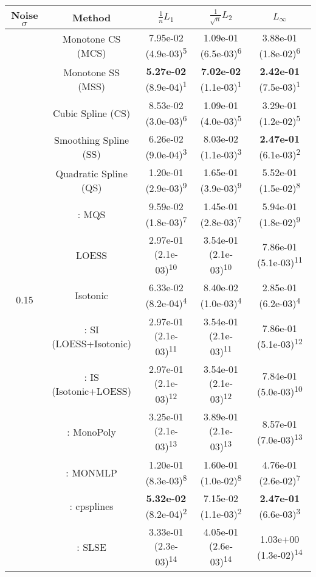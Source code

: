 \begin{tabular}{ccccc}
\toprule
Noise $\sigma$ & Method&$\frac 1n L_1$&$\frac{1}{\sqrt n}L_2$&$L_\infty$\tabularnewline
\midrule
\multirow{14}{*}{0.15}&Monotone CS (MCS)& 7.95e-02 (4.9e-03)\textsuperscript{5}& 1.09e-01 (6.5e-03)\textsuperscript{6}& 3.88e-01 (1.8e-02)\textsuperscript{6}\tabularnewline
&Monotone SS (MSS)& \textbf{5.27e-02} (8.9e-04)\textsuperscript{1}& \textbf{7.02e-02} (1.1e-03)\textsuperscript{1}& \textbf{2.42e-01} (7.5e-03)\textsuperscript{1}\tabularnewline
&Cubic Spline (CS)& 8.53e-02 (3.0e-03)\textsuperscript{6}& 1.09e-01 (4.0e-03)\textsuperscript{5}& 3.29e-01 (1.2e-02)\textsuperscript{5}\tabularnewline
&Smoothing Spline (SS)& 6.26e-02 (9.0e-04)\textsuperscript{3}& 8.03e-02 (1.1e-03)\textsuperscript{3}& \textbf{2.47e-01} (6.1e-03)\textsuperscript{2}\tabularnewline
&Quadratic Spline (QS)& 1.20e-01 (2.9e-03)\textsuperscript{9}& 1.65e-01 (3.9e-03)\textsuperscript{9}& 5.52e-01 (1.5e-02)\textsuperscript{8}\tabularnewline
&\textcite{heMonotoneBsplineSmoothing1998}: MQS& 9.59e-02 (1.8e-03)\textsuperscript{7}& 1.45e-01 (2.8e-03)\textsuperscript{7}& 5.94e-01 (1.8e-02)\textsuperscript{9}\tabularnewline
&LOESS& 2.97e-01 (2.1e-03)\textsuperscript{10}& 3.54e-01 (2.1e-03)\textsuperscript{10}& 7.86e-01 (5.1e-03)\textsuperscript{11}\tabularnewline
&Isotonic& 6.33e-02 (8.2e-04)\textsuperscript{4}& 8.40e-02 (1.0e-03)\textsuperscript{4}& 2.85e-01 (6.2e-03)\textsuperscript{4}\tabularnewline
&\textcite{mammenEstimatingSmoothMonotone1991}: SI (LOESS+Isotonic)& 2.97e-01 (2.1e-03)\textsuperscript{11}& 3.54e-01 (2.1e-03)\textsuperscript{11}& 7.86e-01 (5.1e-03)\textsuperscript{12}\tabularnewline
&\textcite{mammenEstimatingSmoothMonotone1991}: IS (Isotonic+LOESS)& 2.97e-01 (2.1e-03)\textsuperscript{12}& 3.54e-01 (2.1e-03)\textsuperscript{12}& 7.84e-01 (5.0e-03)\textsuperscript{10}\tabularnewline
&\textcite{murrayFastFlexibleMethods2016}: MonoPoly& 3.25e-01 (2.1e-03)\textsuperscript{13}& 3.89e-01 (2.1e-03)\textsuperscript{13}& 8.57e-01 (7.0e-03)\textsuperscript{13}\tabularnewline
&\textcite{cannonMonmlpMultilayerPerceptron2017}: MONMLP& 1.20e-01 (8.3e-03)\textsuperscript{8}& 1.60e-01 (1.0e-02)\textsuperscript{8}& 4.76e-01 (2.6e-02)\textsuperscript{7}\tabularnewline
&\textcite{navarro-garciaConstrainedSmoothingOutofrange2023}: cpsplines& \textbf{5.32e-02} (8.2e-04)\textsuperscript{2}& 7.15e-02 (1.1e-03)\textsuperscript{2}& \textbf{2.47e-01} (6.6e-03)\textsuperscript{3}\tabularnewline
&\textcite{groeneboomConfidenceIntervalsMonotone2023}: SLSE& 3.33e-01 (2.3e-03)\textsuperscript{14}& 4.05e-01 (2.6e-03)\textsuperscript{14}& 1.03e+00 (1.3e-02)\textsuperscript{14}\tabularnewline

\end{tabular}
